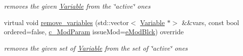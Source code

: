 \begin{Indent}
\begin{DoxyCompactItemize}
\begin{DoxyCompactList}\small\item\em removes the given \mbox{\hyperlink{class_s_m_spp__di__unipi__it_1_1_variable}{Variable}} from the \char`\"{}active\char`\"{} ones \end{DoxyCompactList}\item 
virtual void \mbox{\hyperlink{class_s_m_spp__di__unipi__it_1_1_f_row_constraint_a46c11bb15648f9976eee469c53099b11}{remove\+\_\+variables}} (std\+::vector$<$ \mbox{\hyperlink{class_s_m_spp__di__unipi__it_1_1_variable}{Variable}} $\ast$$>$ \&\&vars, const bool ordered=false, \mbox{\hyperlink{group___modification___t_y_p_e_s_ga544246d8c462e9a2d817c2c30797968f}{c\+\_\+\+Mod\+Param}} issue\+Mod=\mbox{\hyperlink{group___modification___t_y_p_e_s_gga48fddcdd03a03f49b7e389ca1ed938d4a21b14b26b1c0093a0905f6fc010bad29}{e\+Mod\+Blck}}) override
\begin{DoxyCompactList}\small\item\em removes the given set of \mbox{\hyperlink{class_s_m_spp__di__unipi__it_1_1_variable}{Variable}} from the set of \char`\"{}active\char`\"{} ones \end{DoxyCompactList}\end{DoxyCompactItemize}
\end{Indent}
